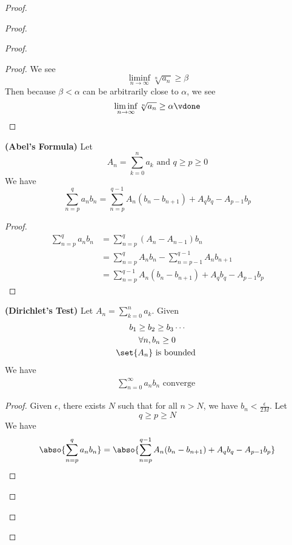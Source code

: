 \documentclass{report}
\begin{document}
\begin{proof}
\begin{proof}
\begin{proof}
\begin{proof}
We see
\begin{equation}
\liminf_{n\to\infty} \sqrt[n]{a_n} \geq \beta 
\end{equation}
Then because $\beta<\alpha $ can be arbitrarily close to $\alpha $, we see
\begin{equation}
\liminf_{n\to\infty} \sqrt[n]{a_n}  \geq \alpha \vdone
\end{equation}
\end{proof}
\begin{lemma}
\label{4.6.4}
\textbf{(Abel's Formula)} Let
\begin{equation}
A_n=\sum_{k=0}^n a_k\text{ and }q\geq p \geq 0
\end{equation}
We have
\begin{equation}
\sum_{n=p}^q a_nb_n=\sum_{n=p}^{q-1}A_n(b_n-b_{n+1})+A_qb_q-A_{p-1}b_p
\end{equation}
\end{lemma}
\begin{proof}
\begin{align}
  \sum_{n=p}^q a_nb_n&=\sum_{n=p}^q (A_{n}-A_{n-1})b_n\\
  &=\sum_{n=p}^q A_nb_n-\sum_{n=p-1}^{q-1}A_nb_{n+1}\\
  &=\sum_{n=p}^{q-1}A_n(b_n-b_{n+1})+A_qb_q-A_{p-1}b_p
\end{align}
\end{proof}
\begin{theorem}
\label{4.6.5}
\textbf{(Dirichlet's Test)} 
Let $A_n=\sum_{k=0}^n a_k$. Given
\begin{gather}
b_1\geq b_2\geq b_3\cdots\\
\forall n, b_n\geq 0\\
\set{A_n}\text{ is bounded  }
\end{gather}
We have
\begin{gather}
\sum_{n=0}^\infty a_nb_n\text{ converge }
\end{gather}
\end{theorem}
\begin{proof}
Given $\epsilon $, there exists $N$ such that for all $n>N$, we have  $b_n<\frac{\epsilon }{2M}$. Let 
\begin{equation}
q\geq p\geq N
\end{equation}
We have
\begin{align}
\abso{\sum_{n=p}^q a_nb_n}&=\abso{\sum_{n=p}^{q-1}A_n(b_n-b_{n+1})+A_qb_q-A_{p-1}b_p}\\

\end{align}
\end{proof}
\end{proof}
\end{proof}
\end{proof}
\end{document}
